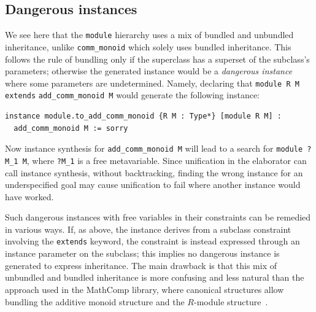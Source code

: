 \documentclass[a4paper,UKenglish,cleveref, autoref, thm-restate]{lipics-v2021}
\begin{document}
\subsection{Dangerous instances} \label{sec:dangerous-instance}
We see here that the \lstinline{module} hierarchy uses a mix of bundled and unbundled inheritance,
unlike \lstinline{comm_monoid} which solely uses bundled inheritance.
This follows the rule of bundling only if the superclass has a superset of the subclass's parameters;
otherwise the generated instance would be a \emph{dangerous instance} where some parameters are undetermined.
Namely, declaring that \lstinline{module R M extends} \lstinline{add_comm_monoid M} would generate the following instance:
\begin{lstlisting}
instance module.to_add_comm_monoid {R M : Type*} [module R M] :
  add_comm_monoid M := sorry
\end{lstlisting}
Now instance synthesis for \lstinline{add_comm_monoid M} will lead to a search for \lstinline{module ?M_1 M},
where \lstinline{?M_1} is a free metavariable.
Since unification in the elaborator can call instance synthesis, without backtracking,
finding the wrong instance for an underspecified goal may cause unification to fail where another instance would have worked.

Such dangerous instances with free variables in their constraints can be remedied in various ways.
If, as above, the instance derives from a subclass constraint involving the \lstinline{extends} keyword,
the constraint is instead expressed through an instance parameter on the subclass;
this implies no dangerous instance is generated to express inheritance.
The main drawback is that this mix of unbundled and bundled inheritance is more confusing and less natural than the approach used in the MathComp library,
where canonical structures allow bundling the additive monoid structure and the $R$-module structure~\cite{MathComp}.
\end{document}
